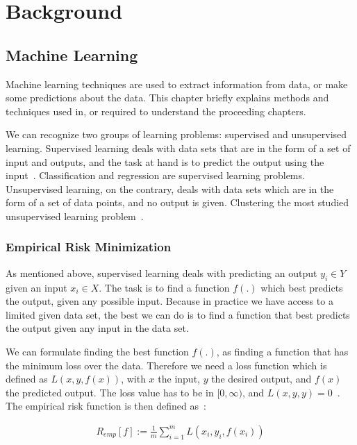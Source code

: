 \chapter{Background}

\section{Machine Learning}
Machine learning techniques are used to extract information from data, or make some predictions about the data. This chapter briefly explains methods and techniques used in, or required to understand the proceeding chapters.

We can recognize two groups of learning problems: supervised and unsupervised learning. Supervised learning deals with data sets that are in the form of a set of input and outputs, and the task at hand is to predict the output using the input~\cite[TODO: chapter]{statistical-learning}. Classification and regression are supervised learning problems. Unsupervised learning, on the contrary, deals with data sets which are in the form of a set of data points, and no output is given. Clustering the most studied unsupervised learning problem~\cite[TODO: chapter]{statistical-learning}.

\subsection{Empirical Risk Minimization}
As mentioned above, supervised learning deals with predicting an output $y_i \in Y$ given an input $x_i \in X$. The task is to find a function $f(.)$ which best predicts the output, given any possible input. Because in practice we have access to a limited given data set, the best we can do is to find a function that best predicts the output given any input in the data set.

We can formulate finding the best function $f(.)$, as finding a function that has the minimum loss over the data. Therefore we need a loss function which is defined as $L(x, y, f(x))$, with $x$ the input, $y$ the desired output, and $f(x)$ the predicted output. The loss value has to be in $[0, \infty)$, and $L(x, y, y) = 0$~\cite[p. 62]{learning-with-kernels}. The empirical risk function is then defined as~\cite[p. 67]{learning-with-kernels}:

  \begin{align}
    R_{emp}[f] := \frac{1}{m}\sum_{i = 1}^{m} L(x_i, y_i, f(x_i))
  \end{align}
  
